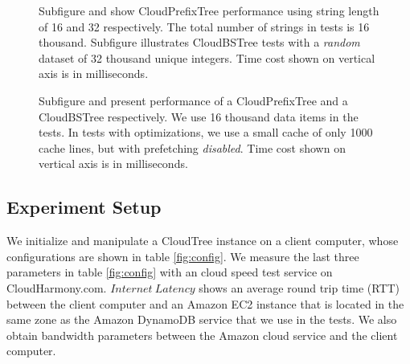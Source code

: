 \documentclass[10pt, conference, compsocconf]{IEEEtran}
\begin{document}
\begin{figure}[t]
\centering
{}
   \hspace{-1\baselineskip}
    \hspace{-1\baselineskip}
\caption[Optional caption for list of figures]{Subfigure  and  show CloudPrefixTree performance using string length of 16 and 32 
 respectively. The total number of strings in tests is 16 thousand. Subfigure  illustrates CloudBSTree tests with a \emph{random} dataset of 32 thousand 
 unique integers. Time cost shown on vertical axis is in milliseconds.
 }
\label{fig:other1}
\end{figure}
\begin{figure}[t]
\centering
{}
   \hspace{-1\baselineskip}
\caption[Optional caption for list of figures]{Subfigure  and  present performance of 
 a CloudPrefixTree and a CloudBSTree respectively. We use 16 thousand data items in the tests.
 In tests with optimizations, we use a small cache of only 1000 cache lines, but with prefetching \emph{disabled}. 
 Time cost shown on vertical axis is in milliseconds.
 }
\label{fig:other2}
\end{figure}



\subsection{Experiment Setup}
\label{setup}

We initialize and manipulate a CloudTree instance on a client computer, whose configurations are shown in
table \ref{fig:config}. 
We measure the last three parameters in table \ref{fig:config} with an cloud speed test service on CloudHarmony.com. 
$Internet\ Latency$ shows an average round trip time (RTT) between the client computer and an Amazon EC2 instance 
that is located in the same zone as the Amazon DynamoDB service that we use in the tests.
We also obtain bandwidth parameters between the Amazon cloud service and the client computer.
\end{document}
